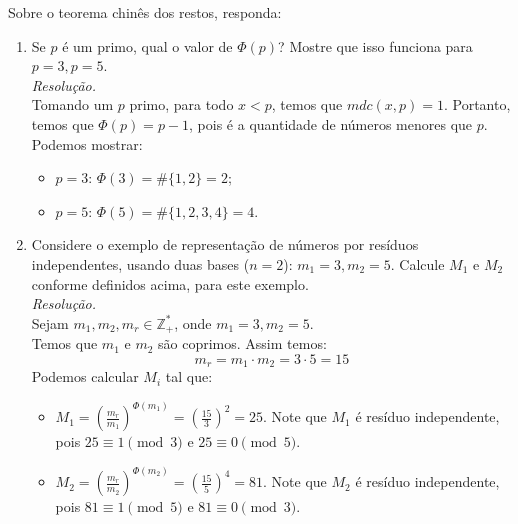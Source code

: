 Sobre o teorema chinês dos restos, responda:
\begin{enumerate}
	\item Se $p$ é um primo, qual o valor de $\Phi(p)$? Mostre que isso funciona para $p = 3, p = 5$. \\
	\emph{Resolução.} \\
	Tomando um $p$ primo, para todo $x < p$, temos que $mdc(x, p) = 1$. Portanto, temos que $\Phi(p) = p - 1$, pois é a quantidade de números menores que $p$. Podemos mostrar:
	\begin{itemize}
		\item $p = 3$: $\Phi(3) = \#\{1, 2\} = 2$;
		\item $p = 5$: $\Phi(5) = \#\{1, 2, 3, 4\} = 4$.
	\end{itemize}

	\item Considere o exemplo de representação de números por resíduos independentes, usando duas bases ($n = 2$): $m_1 = 3, m_2 = 5$. Calcule $M_1$ e $M_2$ conforme definidos acima, para este exemplo. \\
	\emph{Resolução.} \\
	Sejam $m_1, m_2, m_r \in \mathbb{Z}_+^*$, onde $m_1 = 3, m_2 = 5$. \\
	Temos que $m_1$ e $m_2$ são coprimos. Assim temos:
	\begin{displaymath}
		m_r = m_1 \cdot m_2 = 3 \cdot 5 = 15
	\end{displaymath}
	Podemos calcular $M_i$ tal que:
	\begin{itemize}
		\item $M_1 = (\frac{m_r}{m_1})^{\Phi(m_1)} = (\frac{15}{3})^2 = 25$. Note que $M_1$ é resíduo independente, pois $25 \equiv 1 \pmod{3}$ e $25 \equiv 0 \pmod{5}$.
		\item $M_2 = (\frac{m_r}{m_2})^{\Phi(m_2)} = (\frac{15}{5})^4 = 81$. Note que $M_2$ é resíduo independente, pois $81 \equiv 1 \pmod{5}$ e $81 \equiv 0 \pmod{3}$.
	\end{itemize}
\end{enumerate}
